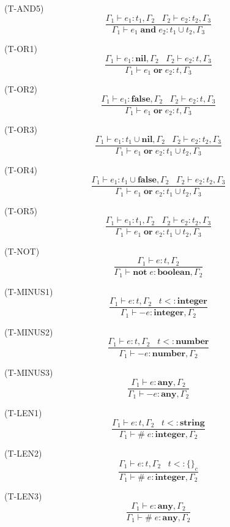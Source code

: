 \documentclass{paper}
\newcommand{\Any}{\mathbf{any}}
\newcommand{\Nil}{\mathbf{nil}}
\newcommand{\False}{\mathbf{false}}
\newcommand{\Boolean}{\mathbf{boolean}}
\newcommand{\Integer}{\mathbf{integer}}
\newcommand{\Number}{\mathbf{number}}
\newcommand{\String}{\mathbf{string}}
\newcommand{\mylabel}[1]{\; (\textsc{#1})}
\newcommand{\env}{\Gamma}
\newcommand{\subtype}{<:}
\begin{document}
\mylabel{T-AND5}
\[
\dfrac{\env_{1} \vdash e_{1}:t_{1}, \env_{2} \;\;\;
       \env_{2} \vdash e_{2}:t_{2}, \env_{3}}
      {\env_{1} \vdash e_{1} \; \mathbf{and} \; e_{2}:t_{1} \cup t_{2}, \env_{3}}
\]

\mylabel{T-OR1}
\[
\dfrac{\env_{1} \vdash e_{1}:\Nil, \env_{2} \;\;\;
       \env_{2} \vdash e_{2}:t, \env_{3}}
      {\env_{1} \vdash e_{1} \; \mathbf{or} \; e_{2}:t, \env_{3}}
\]

\mylabel{T-OR2}
\[
\dfrac{\env_{1} \vdash e_{1}:\False, \env_{2} \;\;\;
       \env_{2} \vdash e_{2}:t, \env_{3}}
      {\env_{1} \vdash e_{1} \; \mathbf{or} \; e_{2}:t, \env_{3}}
\]

\mylabel{T-OR3}
\[
\dfrac{\env_{1} \vdash e_{1}:t_{1} \cup \Nil, \env_{2} \;\;\;
       \env_{2} \vdash e_{2}:t_{2}, \env_{3}}
      {\env_{1} \vdash e_{1} \; \mathbf{or} \; e_{2}:t_{1} \cup t_{2}, \env_{3}}
\]

\mylabel{T-OR4}
\[
\dfrac{\env_{1} \vdash e_{1}:t_{1} \cup \False, \env_{2} \;\;\;
       \env_{2} \vdash e_{2}:t_{2}, \env_{3}}
      {\env_{1} \vdash e_{1} \; \mathbf{or} \; e_{2}:t_{1} \cup t_{2}, \env_{3}}
\]

\mylabel{T-OR5}
\[
\dfrac{\env_{1} \vdash e_{1}:t_{1}, \env_{2} \;\;\;
       \env_{2} \vdash e_{2}:t_{2}, \env_{3}}
      {\env_{1} \vdash e_{1} \; \mathbf{or} \; e_{2}:t_{1} \cup t_{2}, \env_{3}}
\]

\mylabel{T-NOT}
\[
\dfrac{\env_{1} \vdash e:t, \env_{2}}
      {\env_{1} \vdash \mathbf{not} \; e:\Boolean, \env_{2}}
\]

\mylabel{T-MINUS1}
\[
\dfrac{\env_{1} \vdash e:t, \env_{2} \;\;\;
       t \subtype \Integer}
      {\env_{1} \vdash - e:\Integer, \env_{2}}
\]

\mylabel{T-MINUS2}
\[
\dfrac{\env_{1} \vdash e:t, \env_{2} \;\;\;
       t \subtype \Number}
      {\env_{1} \vdash - e:\Number, \env_{2}}
\]

\mylabel{T-MINUS3}
\[
\dfrac{\env_{1} \vdash e:\Any, \env_{2}}
      {\env_{1} \vdash - e:\Any, \env_{2}}
\]

\mylabel{T-LEN1}
\[
\dfrac{\env_{1} \vdash e:t, \env_{2} \;\;\;
       t \subtype \String}
      {\env_{1} \vdash \# \; e:\Integer, \env_{2}}
\]

\mylabel{T-LEN2}
\[
\dfrac{\env_{1} \vdash e:t, \env_{2} \;\;\;
       t \subtype \{\}_{c}}
      {\env_{1} \vdash \# \; e:\Integer, \env_{2}}
\]

\mylabel{T-LEN3}
\[
\dfrac{\env_{1} \vdash e:\Any, \env_{2}}
      {\env_{1} \vdash \# \; e:\Any, \env_{2}}
\]
\end{document}
